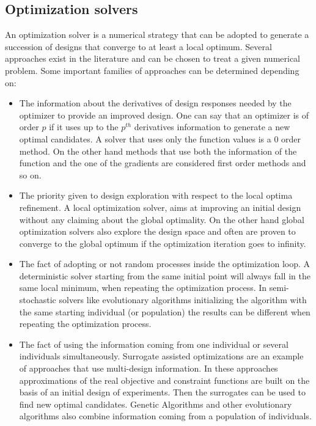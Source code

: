 \subsection {Optimization solvers}
An optimization solver is a numerical strategy that can be adopted to generate a succession of designs that converge to at least a local optimum. Several approaches exist in the literature and can be chosen to treat a given numerical problem. Some important families of approaches can be determined depending on:
\begin{itemize}
\item The information about the derivatives of design responses needed by the optimizer to provide an improved design. One can say that an optimizer is of order $p$ if it uses up to the $p^{th}$ derivatives information to generate a new optimal candidates. A solver that uses only the function values is a 0 order method. On the other hand methods that use both the information of the function and the one of the gradients are considered first order methods and so on.
\item The priority given to design exploration with respect to the local optima refinement. A local optimization solver, aims at improving an initial design without any claiming about the global optimality. On the other hand global optimization solvers also explore the design space and often are proven to converge to the global optimum if the optimization iteration goes to infinity. 
\item The fact of adopting or not random processes inside the optimization loop. A deterministic solver starting from the same initial point will always fall in the same local minimum, when repeating the optimization process. In semi-stochastic solvers like evolutionary algorithms \cite{simon2013evolutionary} initializing the algorithm with the same starting individual (or population) the results can be different when repeating the optimization process. 
\item The fact of using the information coming from one individual or several individuals simultaneously. Surrogate assisted optimizations \cite{forrester2008engineering} are an example of approaches that use multi-design information. In these approaches approximations of the real objective and constraint functions are built on the basis of an initial design of experiments. Then the surrogates can be used to find new optimal candidates. Genetic Algorithms and other evolutionary algorithms also combine information coming from a population of individuals.
\end{itemize}
